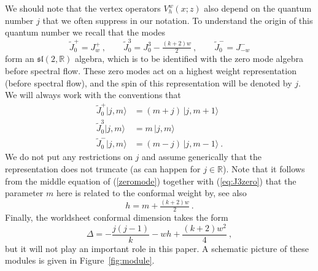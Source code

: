 \documentclass[12pt,a4paper]{article}
\newcommand{\be}{\begin{equation}}
\newcommand{\ee}{\end{equation}}
\begin{document}
We should note that the vertex operators $V_h^w(x;z)$ also depend on the quantum number $j$ that we often suppress in our notation. To understand the origin of this quantum number we recall that the modes 
\be\label{zeromode}
\tilde{J}^+_0 = J^+_w \ , \qquad \tilde{J}^{3}_0 = J^3_0-\tfrac{(k+2)w}{2} \ , \qquad \tilde{J}^-_0 = J^-_{-w} 
\ee
form an $\mathfrak{sl}(2,\mathds{R})$ algebra, which is to be identified with the zero mode algebra before spectral flow. These zero modes act on a highest weight representation (before spectral flow), and the spin of this representation will be denoted by $j$. We will always work with the conventions that 
\begin{subequations}\label{eq:sl2action}
\begin{align}
\tilde{J}^+_0 |j,m\rangle & = (m+j) \, |j,m+1\rangle \label{eq:J+zero} \\
\tilde{J}^3_0 |j,m\rangle & = m \, |j,m\rangle \label{eq:J3zero} \\
\tilde{J}^-_0 |j,m\rangle & = (m-j) \, |j,m-1\rangle \ . \label{eq:J-zero}  
\end{align}
\end{subequations}
We do not put any restrictions on $j$ and assume generically that the representation does not truncate (as can happen for $j \in \mathds{R}$). 
Note that it follows from the middle equation of (\ref{zeromode}) together with (\ref{eq:J3zero}) that the parameter $m$ here is related to the conformal weight by, see also \cite[eq.~(2.14)]{Gaberdiel:2018rqv}
\be 
h=m+\tfrac{(k+2)w}{2}\ . \label{eq:hm relation}
\ee 
Finally, the worldsheet conformal dimension takes the form 
\be\label{Deltadef}
\Delta = - \frac{j(j-1)}{k}-w h  + \frac{(k+2)w^2}{4}  \ ,
\ee
but it will not play an important role in this paper.
A schematic picture of these modules is given in Figure~\ref{fig:module}.
\end{document}
